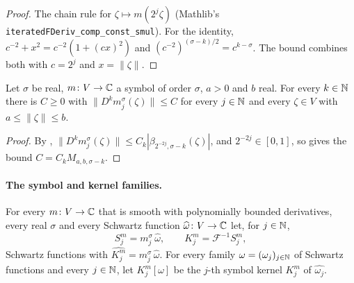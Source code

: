 \begin{proof}
\leanok
The chain rule for $\zeta \mapsto m(2^j \zeta)$ (Mathlib's
\texttt{iteratedFDeriv\_\allowbreak comp\_\allowbreak const\_\allowbreak smul}). For the
identity, $c^{-2} + x^2 = c^{-2} (1 + (cx)^2)$ and $(c^{-2})^{(\sigma - k)/2} = c^{k - \sigma}$.
The bound combines both with $c = 2^j$ and $x = \|\zeta\|$.
\end{proof}

\begin{lemma}
\label{lem:scaled-symbol-annulus}
\leanok
{}
Let $\sigma$ be real, $m \colon V \to \mathbb{C}$ a symbol of order $\sigma$, $a > 0$ and $b$ real. For
every $k \in \mathbb{N}$ there is $C \geq 0$ with $\|D^k m^\sigma_j(\zeta)\| \leq C$ for every $j \in \mathbb{N}$
and every $\zeta \in V$ with $a \leq \|\zeta\| \leq b$.
\end{lemma}

\begin{proof}
\leanok
By ,
$\|D^k m^\sigma_j(\zeta)\| \leq C_k |\beta_{2^{-2j}, \sigma - k}(\zeta)|$, and
$2^{-2j} \in [0, 1]$, so  gives the bound
$C = C_k M_{a,b,\sigma-k}$.
\end{proof}

\paragraph{The symbol and kernel families.}

\begin{definition}
\label{def:symbol-family}
\leanok
{}
For every $m \colon V \to \mathbb{C}$ that is smooth with polynomially bounded derivatives, every real
$\sigma$ and every Schwartz function $\widehat\omega \colon V \to \mathbb{C}$ let, for $j \in \mathbb{N}$,
\[
  S^m_j = m^\sigma_j \, \widehat\omega , \qquad K^m_j = \mathcal F^{-1} S^m_j ,
\]
Schwartz functions with $\widehat{K^m_j} = m^\sigma_j \, \widehat\omega$. For every family
$\omega = (\omega_j)_{j \in \mathbb{N}}$ of Schwartz functions and every $j \in \mathbb{N}$, let
$K^m_j[\omega]$ be the $j$-th symbol kernel $K^m_j$ of $\widehat{\omega_j}$.
\end{definition}


